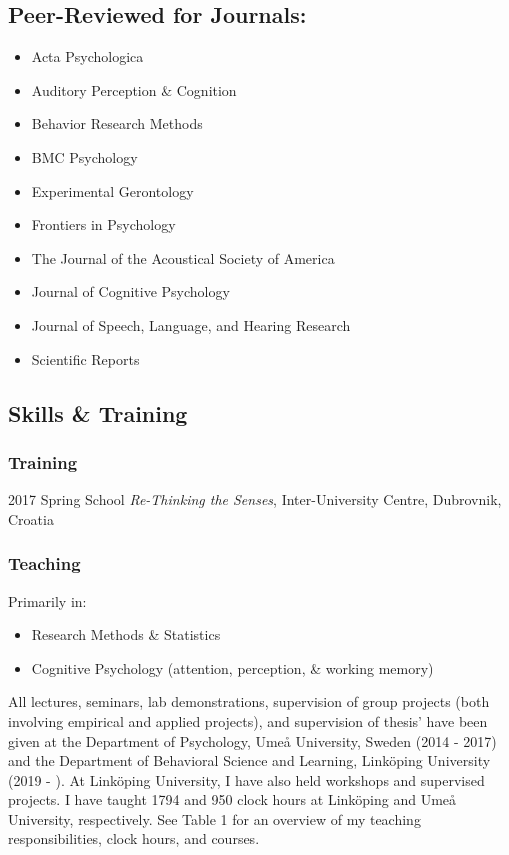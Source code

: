 \documentclass[]{article}
\providecommand{\tightlist}{%
  \setlength{\itemsep}{0pt}\setlength{\parskip}{0pt}}
\begin{document}
\subsection{Peer-Reviewed for
Journals:}\label{peer-reviewed-for-journals}

\begin{itemize}
\item
  Acta Psychologica
\item
  Auditory Perception \& Cognition
\item
  Behavior Research Methods
\item
  BMC Psychology
\item
  Experimental Gerontology
\item
  Frontiers in Psychology
\item
  The Journal of the Acoustical Society of America
\item
  Journal of Cognitive Psychology
\item
  Journal of Speech, Language, and Hearing Research
\item
  Scientific Reports
\end{itemize}

\subsection{Skills \& Training}\label{skills-training}

\subsubsection{Training}\label{training}

2017 Spring School \emph{Re-Thinking the Senses}, Inter-University
Centre, Dubrovnik, Croatia

\subsubsection{Teaching}\label{teaching}

Primarily in:

\begin{itemize}
\tightlist
\item
  Research Methods \& Statistics
\item
  Cognitive Psychology (attention, perception, \& working memory)
\end{itemize}

All lectures, seminars, lab demonstrations, supervision of group
projects (both involving empirical and applied projects), and
supervision of thesis' have been given at the Department of Psychology,
Umeå University, Sweden (2014 - 2017) and the Department of Behavioral
Science and Learning, Linköping University (2019 - ). At Linköping
University, I have also held workshops and supervised projects. I have
taught 1794 and 950 clock hours at Linköping and Umeå University,
respectively. See Table 1 for an overview of my teaching
responsibilities, clock hours, and courses.
\end{document}

